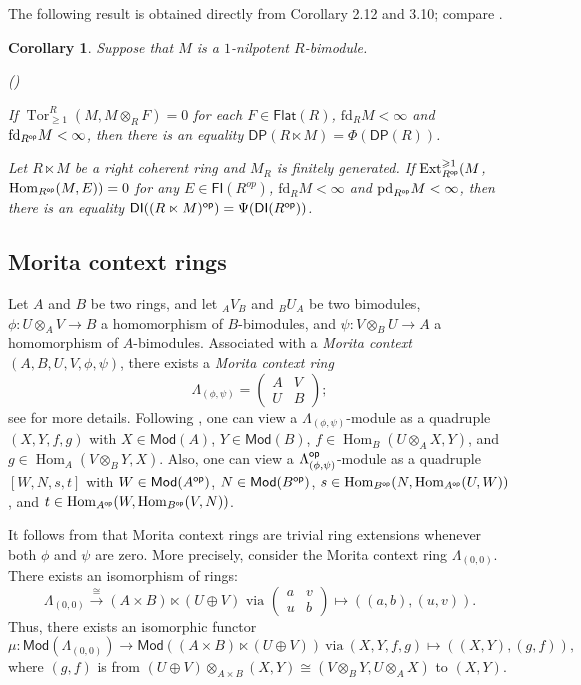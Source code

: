 \documentclass[10pt,twoside]{amsart}
\theoremstyle{bfupright head,slanted body}
\theoremstyle{bfupright head,upright body}
\theoremstyle{fixed bf head,slanted body}
\newtheorem{cor}[res]{Corollary}        \newtheorem*{cor*}{Corollary}
\theoremstyle{fixed bf head,upright body}
\theoremstyle{numbered paragraph}
\newlength{\thmlistleft}        %
\newlength{\thmlistright}       %
\newlength{\thmlistpartopsep}   %
\newlength{\thmlisttopsep}      %
\newlength{\thmlistparsep}      %
\newlength{\thmlistitemsep}     %
\newcounter{rqm}
\newenvironment{rqm}{\begin{list}{\upshape (\arabic{rqm})}%
    {\usecounter{rqm}%
      \setlength{\leftmargin}{\thmlistleft}%
      \setlength{\labelwidth}{\thmlistleft}%
      \setlength{\rightmargin}{\thmlistright}%
      \setlength{\partopsep}{\thmlistpartopsep}%
      \setlength{\topsep}{\thmlisttopsep}%
      \setlength{\parsep}{\thmlistparsep}%
      \setlength{\itemsep}{\thmlistitemsep}}}%
  {\end{list}}%
\newcommand{\thmcite}[2][?]{\cite[Theorem~#1]{#2}}
\newcommand{\prpcite}[2][?]{\cite[Proposition~#1]{#2}}
\numberwithin{equation}{res}
\newcommand{\DP}{\mathsf{DP}}
\newcommand{\DI}{\mathsf{DI}}
\newcommand{\fd}{\mathrm{fd}}
\newcommand{\pd}{\mathrm{pd}}
\newcommand{\Flat}{\mathsf{Flat}}
\newcommand{\FI}{\mathsf{FI}}
\newcommand{\Mod}{\mathsf{Mod}}
\newcommand{\Rop}{R^{\sf op}}
\newcommand{\op}{\sf op}
\newcommand{\Hom}{\operatorname{Hom}}
\newcommand{\Ext}{\operatorname{Ext}}
\newcommand{\Tor}{\operatorname{Tor}}
\begin{document}
The following result is obtained directly from Corollary 2.12 and 3.10; compare \cite[Theorem 2.1 and 3.2]{2023Mao}.

\begin{cor} \label{DPTRM = Phi in trivial extension}
Suppose that $M$ is a $1$-nilpotent $R$-bimodule.
\begin{rqm}
\item
If $\Tor_{\geqslant 1}^R(M,M\otimes_R F)=0$ for each $F\in \Flat(R)$,
$\fd_{R}M<\infty$ and $\fd_{\Rop}M<\infty$, then there is an equality $\DP(R\ltimes M) = \Phi(\DP(R))$. 

\item
Let $R\ltimes M$ be a right coherent ring and $M_{R}$ is finitely generated.
If $\Ext_{\Rop}^{\geqslant 1}(M$, $\Hom_{\Rop}(M, E))=0$ for any $E\in\FI(R^{op})$, 
$\fd_{R}M<\infty$ and $\pd_{\Rop}M<\infty$,
then there is an equality $\DI((R\ltimes M)^{\op}) = \Psi(\DI(\Rop))$.
\end{rqm}
\end{cor}


\subsection{Morita context rings}
\label{Morita context rings}%
Let $A$ and $B$ be two rings,
and let $_AV_B$ and $_BU_A$ be two bimodules,
$\phi : U\otimes_AV \to B$ a homomorphism of $B$-bimodules,
and $\psi : V\otimes_BU \to A$ a homomorphism of $A$-bimodules.
Associated with a \emph{Morita context} $(A,B,U,V,\phi,\psi)$,
there exists a \emph{Morita context ring}
\[\Lambda_{(\phi,\psi)}=\begin{pmatrix}A & V \\ U & B\end{pmatrix};\]
see \cite{BASS1968, MORITA1958} for more details.
Following \thmcite[1.5]{GF1982}, one can view a $\Lambda_{(\phi,\psi)}$-module
as a quadruple $(X,Y,f,g)$ with $X \in \Mod(A)$, $Y \in \Mod(B)$,
$f \in \Hom_B(U\otimes_AX,Y)$, and $g \in \Hom_A(V\otimes_BY,X)$. Also, one can view a $\Lambda_{(\phi,\psi)}^{\op}$-module as a quadruple
$[W,N,s,t]$ with $W \in \Mod(A^{\op})$, $N \in \Mod(B^{\op})$,
$s \in \Hom_{B^{\op}}(N,\Hom_{A^{\op}}(U,W))$, and $t \in \Hom_{A^{\op}}(W,\Hom_{B^{\op}}(V,N))$.

It follows from \prpcite[2.5]{GFARTIN} that Morita context rings are trivial ring extensions
whenever both $\phi$ and $\psi$ are zero.
More precisely, consider the Morita context ring $\Lambda_{(0,0)}$.
There exists an isomorphism of rings:
$$\Lambda_{(0,0)}\overset{\cong}\longrightarrow (A\times B)\ltimes (U \oplus V)
\,\,\text{via}\,\, \begin{pmatrix}a & v \\ u & b\end{pmatrix} \mapsto
((a,b),(u,v)).$$
Thus, there exists an isomorphic functor
$$\mu: \Mod(\Lambda_{(0,0)}) \to \Mod((A\times B)\ltimes (U \oplus V))\ \mathrm{via}\
(X,Y,f,g) \mapsto ((X,Y),(g,f)),$$
where $(g,f)$ is from
$(U \oplus V)\otimes_{A\times B}(X, Y) \cong (V\otimes_BY,U\otimes_AX)$ to $(X, Y)$.
\end{document}
